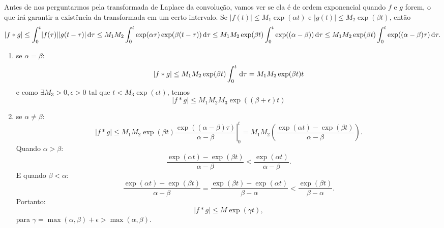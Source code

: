 Antes de nos perguntarmos pela transformada de Laplace da convolução, vamos ver
se ela é de ordem exponencial quando $f$ e $g$ forem, o que irá garantir a
existência da transformada em um certo intervalo. Se $|f(t)| \leq M_1
\exp(\alpha t)$ e $|g(t)| \leq M_2 \exp(\beta t)$, então
\begin{dmath*}
  \lvert f * g \rvert \leq \int_0^{t} \lvert f(\tau) \rvert \lvert g(t - \tau)
  \rvert \vi{\tau}
  \leq M_1 M_2 \int_0^{t} \exp(\alpha \tau) \exp(\beta (t - \tau)) \vi{\tau}
  \leq M_1 M_2 \exp(\beta t) \int_0^t \exp( (\alpha - \beta) ) \vi{\tau}
  \leq M_1 M_2 \exp(\beta t) \int_0^t \exp( (\alpha - \beta) \tau) \vi{\tau}.
\end{dmath*}
\begin{enumerate}
  \item se $\alpha = \beta$:
    \begin{dmath*}
      \lvert f * g \rvert \leq M_1 M_2 \exp(\beta t) \int_0^t \vi{\tau}
      = M_1 M_2 \exp(\beta t) t
    \end{dmath*}
    e como $\exists M_3 > 0, \epsilon > 0$ tal que $t < M_3 \exp(\epsilon t)$,
    temos
    \begin{dmath*}
      \lvert f * g \rvert \leq M_1 M_2 M_3 \exp( (\beta + \epsilon) t)
    \end{dmath*}

  \item se $\alpha \neq \beta$:
    \begin{dmath*}
      \lvert f * g \rvert \leq M_1 M_2 \exp(\beta t) \left. \frac{\exp( (\alpha - \beta)
      \tau)}{\alpha - \beta} \right|_0^t
      = M_1 M_2 \left( \frac{\exp(\alpha t) - \exp(\beta t)}{\alpha - \beta}
      \right).
    \end{dmath*}
    Quando $\alpha > \beta$:
    \begin{dmath}
      \frac{\exp(\alpha t) - \exp(\beta t)}{\alpha - \beta} <
      \frac{\exp(\alpha t)}{\alpha - \beta}.
    \end{dmath}
    E quando $\beta < \alpha$:
    \begin{dmath*}
      \frac{\exp(\alpha t) - \exp(\beta t)}{\alpha - \beta} =
      \frac{\exp(\beta t) - \exp(\alpha t)}{\beta - \alpha}
      < \frac{\exp(\beta t)}{\beta - \alpha}.
    \end{dmath*}
    Portanto:
    \begin{dmath*}
      \lvert f * g \rvert \leq M \exp(\gamma t),
    \end{dmath*}
    para $\gamma = \max(\alpha, \beta) + \epsilon > \max(\alpha, \beta)$.
\end{enumerate}

